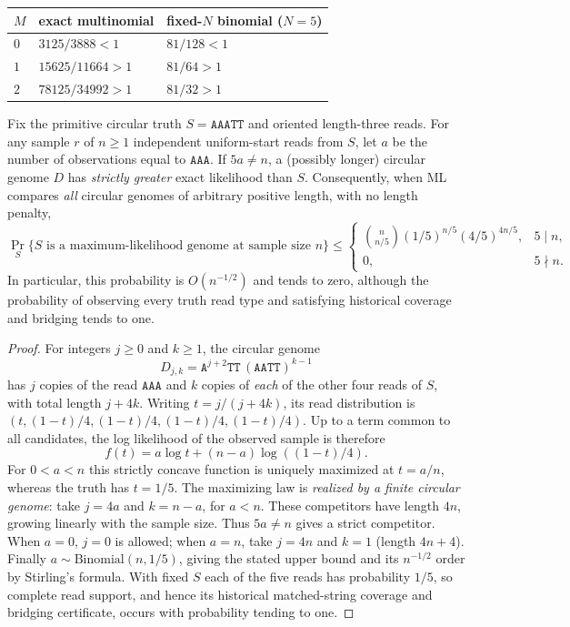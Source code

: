 \begin{center}
\begin{tabular}{@{}lll@{}}
\toprule
$M$ & exact multinomial & fixed-$N$ binomial ($N=5$) \\
\midrule
$0$ & $3125/3888<1$ & $81/128<1$ \\
$1$ & $15625/11664>1$ & $81/64>1$ \\
$2$ & $78125/34992>1$ & $81/32>1$ \\
\bottomrule
\end{tabular}
\end{center}


\begin{theorem}
\label{thm:aaatt-unrestricted}
Fix the primitive circular truth $S=\texttt{AAATT}$ and oriented
length-three reads. For any sample $r$ of $n\ge1$ independent
uniform-start reads from $S$, let $a$ be the number of observations
equal to $\texttt{AAA}$. If $5a\ne n$, a (possibly longer) circular
genome $D$ has \emph{strictly greater} exact likelihood than $S$.
Consequently, when ML compares \emph{all} circular genomes of
arbitrary positive length, with no length penalty,
\[
 \Pr_S\{S\text{ is a maximum-likelihood genome at sample size }n\}
 \le
 \begin{cases}
 \displaystyle {n\choose n/5}(1/5)^{n/5}(4/5)^{4n/5},&5\mid n,\\
 0,&5\nmid n.
 \end{cases}
\]
In particular, this probability is $O(n^{-1/2})$ and tends to zero,
although the probability of observing every truth read type and
satisfying historical coverage and bridging tends to one.
\end{theorem}
\begin{proof}
For integers $j\ge0$ and $k\ge1$, the circular genome
\[
 D_{j,k}=\texttt{A}^{j+2}\texttt{TT}\,
                (\texttt{AATT})^{k-1}
\]
has $j$ copies of the read $\texttt{AAA}$ and $k$ copies of
\emph{each} of the other four reads of $S$, with total length
$j+4k$. Writing $t=j/(j+4k)$, its read distribution is
$(t,(1-t)/4,(1-t)/4,(1-t)/4,(1-t)/4)$.
Up to a term common to all candidates, the log likelihood
of the observed sample is therefore
\[
 f(t)=a\log t+(n-a)\log((1-t)/4).
\]
For $0<a<n$ this strictly concave function is uniquely maximized
at $t=a/n$, whereas the truth has $t=1/5$. The maximizing law
is \emph{realized by a finite circular genome}: take
$j=4a$ and $k=n-a$, for $a<n$. These competitors have
length $4n$, growing linearly with the sample size.
Thus $5a\ne n$ gives a strict competitor. When $a=0$,
$j=0$ is allowed; when $a=n$, take $j=4n$ and $k=1$
(length $4n+4$).
Finally $a\sim\mathrm{Binomial}(n,1/5)$, giving the stated
upper bound and its $n^{-1/2}$ order by Stirling's formula.
With fixed $S$ each of the five reads has probability $1/5$,
so complete read support, and hence its historical matched-string
coverage and bridging certificate, occurs with probability tending
to one.
\end{proof}

